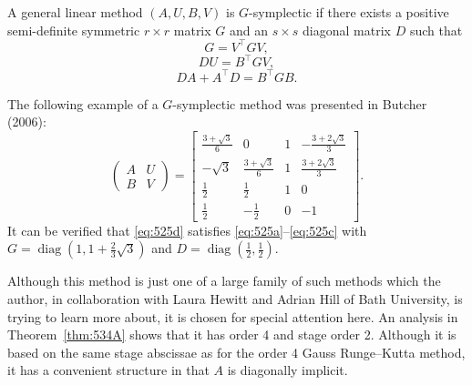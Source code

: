 \begin{definition}

  \label{def:525A}
A general linear method $(A, U, B, V)$ is $G$-symplectic if there exists a positive semi-definite symmetric $r \times r$ matrix $G$ and an $s \times s$ diagonal matrix $D$ such that
\[
G = V^{\top} G V, \tag{525a}
\]
\[
D U = B^{\top} G V, \tag{525b}
\]
\[
D A + A^{\top} D = B^{\top} G B. \tag{525c}
\]

The following example of a $G$-symplectic method was presented in Butcher (2006):
\[
\begin{pmatrix}
A & U \\
B & V
\end{pmatrix}
=
\begin{bmatrix}
\frac{3+\sqrt{3}}{6} & 0 & 1 & -\frac{3+2\sqrt{3}}{3} \\[4pt]
-\sqrt{3} & \frac{3+\sqrt{3}}{6} & 1 & \frac{3+2\sqrt{3}}{3} \\[4pt]
\frac{1}{2} & \frac{1}{2} & 1 & 0 \\[4pt]
\frac{1}{2} & -\frac{1}{2} & 0 & -1
\end{bmatrix}. \tag{525d}
\]
It can be verified that \eqref{eq:525d} satisfies \eqref{eq:525a}--\eqref{eq:525c} with $G = \operatorname{diag}\left(1, 1+\frac{2}{3}\sqrt{3}\right)$ and $D = \operatorname{diag}\left(\frac{1}{2}, \frac{1}{2}\right)$.

Although this method is just one of a large family of such methods which the author, in collaboration with Laura Hewitt and Adrian Hill of Bath University, is trying to learn more about, it is chosen for special attention here. An analysis in Theorem~\ref{thm:534A} shows that it has order 4 and stage order 2. Although it is based on the same stage abscissae as for the order 4 Gauss Runge--Kutta method, it has a convenient structure in that $A$ is diagonally implicit.


\end{definition}
